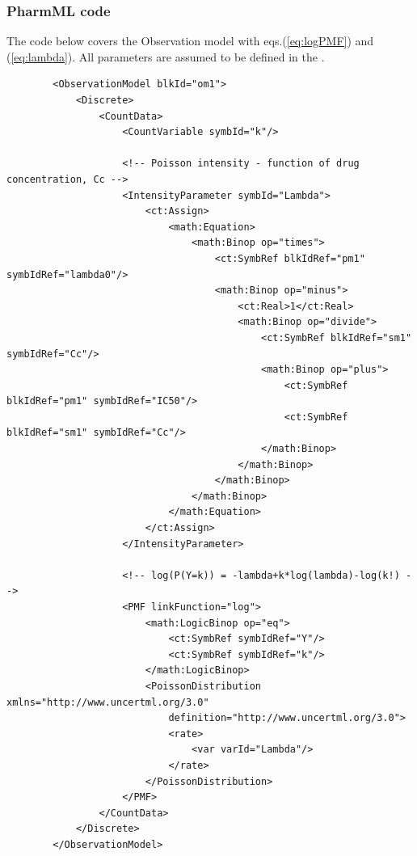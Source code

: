 \subsubsection{PharmML code}
The code below covers the Observation model with eqs.(\ref{eq:logPMF}) and (\ref{eq:lambda}).
All parameters are assumed to be defined in the .
\lstset{language=XML}
\begin{lstlisting}
        <ObservationModel blkId="om1">
            <Discrete>
                <CountData>
                    <CountVariable symbId="k"/>
                    
                    <!-- Poisson intensity - function of drug concentration, Cc -->                    
                    <IntensityParameter symbId="Lambda">
                        <ct:Assign>
                            <math:Equation>
                                <math:Binop op="times">
                                    <ct:SymbRef blkIdRef="pm1" symbIdRef="lambda0"/>
                                    <math:Binop op="minus">
                                        <ct:Real>1</ct:Real>
                                        <math:Binop op="divide">
                                            <ct:SymbRef blkIdRef="sm1" symbIdRef="Cc"/>
                                            <math:Binop op="plus">
                                                <ct:SymbRef blkIdRef="pm1" symbIdRef="IC50"/>
                                                <ct:SymbRef blkIdRef="sm1" symbIdRef="Cc"/>
                                            </math:Binop>
                                        </math:Binop>
                                    </math:Binop>
                                </math:Binop>
                            </math:Equation>
                        </ct:Assign>
                    </IntensityParameter>
                    
                    <!-- log(P(Y=k)) = -lambda+k*log(lambda)-log(k!) -->
                    <PMF linkFunction="log">
                        <math:LogicBinop op="eq">
                            <ct:SymbRef symbIdRef="Y"/>
                            <ct:SymbRef symbIdRef="k"/>
                        </math:LogicBinop>
                        <PoissonDistribution xmlns="http://www.uncertml.org/3.0" 
                            definition="http://www.uncertml.org/3.0">
                            <rate>
                                <var varId="Lambda"/>
                            </rate>
                        </PoissonDistribution>
                    </PMF>
                </CountData>
            </Discrete>
        </ObservationModel>
\end{lstlisting}


